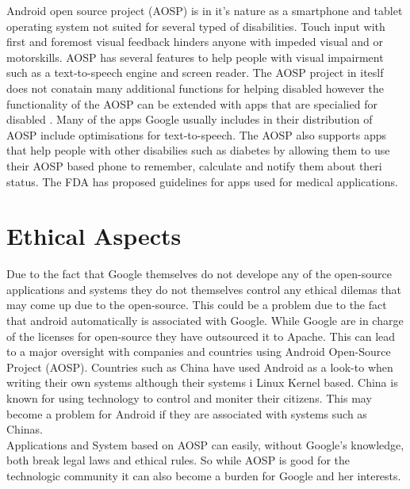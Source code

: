 \documentclass[conference]{IEEEtran}
\begin{document}

Android open source project (AOSP) is in it's nature as a smartphone and tablet operating system not suited for several typed of disabilities. Touch input with first and foremost visual feedback hinders anyone with impeded visual and or motorskills. AOSP has several features to help people with visual impairment such as a text-to-speech engine and screen reader\cite{android-disabled-help}. The AOSP project in iteslf does not conatain many additional functions for helping disabled however the functionality of the AOSP can be extended with apps that are specialied for disabled \cite{android-disabled-apps}. Many of the apps Google usually includes in their distribution of AOSP include optimisations for text-to-speech\cite{android-disabled-help}. The AOSP also supports apps that help people with other disabilies such as diabetes\cite{android-disabled-diabetes} by allowing them to use their AOSP based phone to remember, calculate and notify them about theri status. The FDA has proposed guidelines for apps used for medical applications\cite{android-disabled-FDA}.



\section{Ethical Aspects}
\label{ethics}

Due to the fact that Google themselves do not develope any of the open-source applications and systems they do not themselves control any ethical dilemas that may come up due to the open-source. This could be a problem due to the fact that android automatically is associated with Google. While Google are in charge of the licenses for open-source they have outsourced it to Apache.\cite{android-licenses} This can lead to a major oversight with companies and countries using Android Open-Source Project (AOSP). Countries such as China have used Android as a look-to when writing their own systems \cite{country-license} although their systems i Linux Kernel based. China is known for using technology to control and moniter their citizens. This may become a problem for Android if they are associated with systems such as Chinas.\\
Applications and System based on AOSP can easily, without Google's knowledge, both break legal laws and ethical rules. So while AOSP is good for the technologic community it can also become a burden for Google and her interests.
\end{document}
